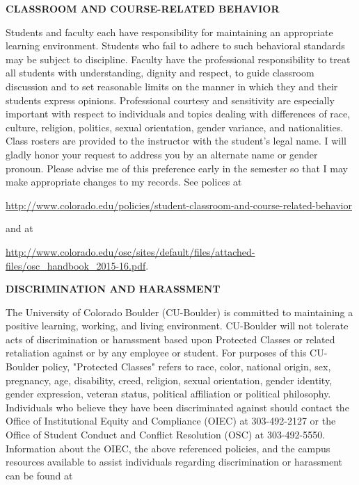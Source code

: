 \documentclass[11pt]{article}
\begin{document}

\bigskip

\textbf{\normalsize CLASSROOM AND COURSE-RELATED BEHAVIOR}

Students and faculty each have responsibility for maintaining an
appropriate learning environment. Students who fail to adhere to
such behavioral standards may be subject to discipline. Faculty have
the professional responsibility to treat all students with
understanding, dignity and respect, to guide classroom discussion
and to set reasonable limits on the manner in which they and their
students express opinions. Professional courtesy and sensitivity
are especially important with respect to individuals and topics
dealing with differences of race, culture, religion, politics,
sexual orientation, gender variance, and nationalities. Class
rosters are provided to the instructor with the student's legal
name. I will gladly honor your request to address you by an
alternate name or gender pronoun. Please advise me of this
preference early in the semester so that I may make appropriate
changes to my records. See polices at

{\footnotesize \url{http://www.colorado.edu/policies/student-classroom-and-course-related-behavior} } 

and at

\noindent
{\footnotesize\url{http://www.colorado.edu/osc/sites/default/files/attached-files/osc_handbook_2015-16.pdf}. }


\bigskip
\textbf{\normalsize DISCRIMINATION AND HARASSMENT}

The University of Colorado Boulder (CU-Boulder) is committed to maintaining a positive learning, working, and living environment. CU-Boulder will not tolerate acts of discrimination or harassment based upon Protected Classes or related retaliation against or by any employee or student. For purposes of this CU-Boulder policy, "Protected Classes" refers to race, color, national origin, sex, pregnancy, age, disability, creed, religion, sexual orientation, gender identity, gender expression, veteran status, political affiliation or political philosophy. Individuals who believe they have been discriminated against should contact the Office of Institutional Equity and Compliance (OIEC) at 303-492-2127 or the Office of Student Conduct and Conflict Resolution (OSC) at 303-492-5550. Information about the OIEC, the above referenced policies, and the campus resources available to assist individuals regarding discrimination or harassment can be found at 
\end{document}
